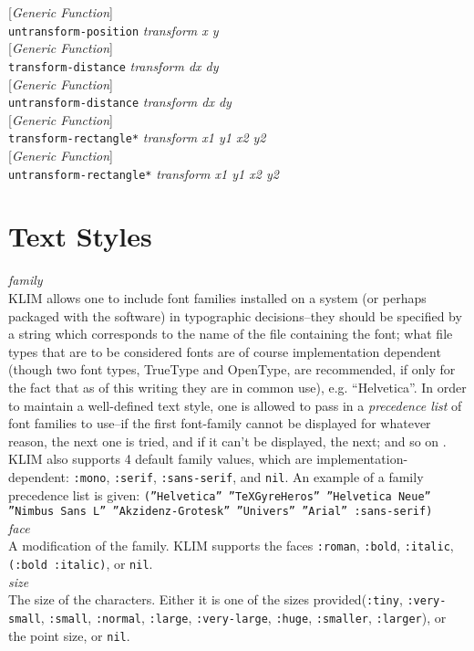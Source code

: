 \documentclass[10pt]{book}
\newenvironment{defother}[2]{[\textit{#1}]\\\texttt{#2}}{\\}
\newenvironment{defgeneric}[1]{\begin{defother}{Generic Function}{#1}}{\end{defother}}
\begin{document}
\begin{defgeneric}{untransform-position} \textit{transform x y}\end{defgeneric}
\begin{defgeneric}{transform-distance} \textit{transform dx dy}\end{defgeneric}
\begin{defgeneric}{untransform-distance} \textit{transform dx dy}\end{defgeneric}
\begin{defgeneric}{transform-rectangle*} \textit{transform x1 y1 x2 y2}\end{defgeneric}
\begin{defgeneric}{untransform-rectangle*} \textit{transform x1 y1 x2 y2}\end{defgeneric}
\section{Text Styles}
\textit{family}\\
KLIM allows one to include font families installed on a system (or perhaps packaged with the software) in typographic decisions--they should be specified by a string which corresponds to the name of the file containing the font; what file types that are to be considered fonts are of course implementation dependent (though two font types, TrueType and OpenType, are recommended, if only for the fact that as of this writing they are in common use), e.g. ``Helvetica''. In order to maintain a well-defined text style, one is allowed to pass in a \textit{precedence list} of font families to use--if the first font-family cannot be displayed for whatever reason, the next one is tried, and if it can't be displayed, the next; and so on . KLIM also supports 4 default family values, which are implementation-dependent: \texttt{:mono}, \texttt{:serif}, \texttt{:sans-serif}, and \texttt{nil}. An example of a family precedence list is given: \texttt{(''Helvetica'' ''TeXGyreHeros'' ''Helvetica Neue'' ''Nimbus Sans L'' ''Akzidenz-Grotesk'' ''Univers'' ''Arial'' :sans-serif)} \\
\textit{face}\\
A modification of the family. KLIM supports the faces \texttt{:roman}, \texttt{:bold}, \texttt{:italic}, \texttt{(:bold :italic)}, or \texttt{nil}.\\
\textit{size}\\
The size of the characters. Either it is one of the sizes provided(\texttt{:tiny}, \texttt{:very-small}, \texttt{:small}, \texttt{:normal}, \texttt{:large}, \texttt{:very-large}, \texttt{:huge}, \texttt{:smaller}, \texttt{:larger}), or the point size, or \texttt{nil}.\\
\end{document}
